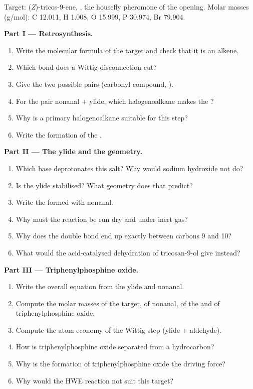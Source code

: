 \begin{problem}
\label{pb:b2:wittig:1}
Target: (\textit{Z})-tricos-9-ene, , the housefly pheromone of the
opening. Molar masses (\unit{g/mol}): C 12.011, H 1.008, O 15.999, P 30.974, Br 79.904.

\medskip
\noindent\textbf{Part I --- Retrosynthesis.}
\begin{enumerate}
  \item Write the molecular formula of the target and check that it is an alkene.
  \item Which bond does a Wittig disconnection cut?
  \item Give the two possible pairs (carbonyl compound, ).
  \item For the pair nonanal + ylide, which halogenoalkane makes the ?
  \item Why is a primary halogenoalkane suitable for this step?
  \item Write the formation of the .
\end{enumerate}

\medskip
\noindent\textbf{Part II --- The ylide and the geometry.}
\begin{enumerate}[resume]
  \item Which base deprotonates this salt? Why would sodium hydroxide not do?
  \item Is the ylide stabilised? What geometry does that predict?
  \item Write the  formed with nonanal.
  \item Why must the reaction be run dry and under inert gas?
  \item Why does the double bond end up exactly between carbons 9 and 10?
  \item What would the acid-catalysed dehydration of tricosan-9-ol give instead?
\end{enumerate}

\medskip
\noindent\textbf{Part III --- Triphenylphosphine oxide.}
\begin{enumerate}[resume]
  \item Write the overall equation from the ylide and nonanal.
  \item Compute the molar masses of the target, of nonanal, of the  and of
        triphenylphosphine oxide.
  \item Compute the atom economy of the Wittig step (ylide + aldehyde).
  \item How is triphenylphosphine oxide separated from a hydrocarbon?
  \item Why is the formation of triphenylphosphine oxide the driving force?
  \item Why would the HWE reaction not suit this target?
\end{enumerate}


\end{problem}
